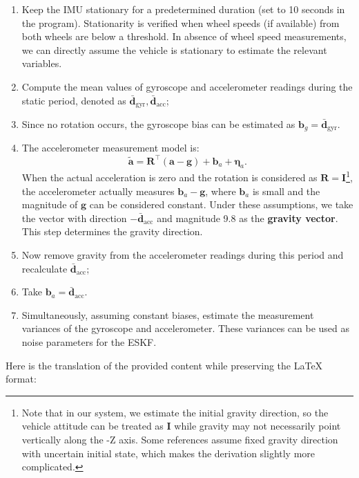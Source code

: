 \begin{enumerate}
\item Keep the IMU stationary for a predetermined duration (set to 10 seconds in the program). Stationarity is verified when wheel speeds (if available) from both wheels are below a threshold. In absence of wheel speed measurements, we can directly assume the vehicle is stationary to estimate the relevant variables.

\item Compute the mean values of gyroscope and accelerometer readings during the static period, denoted as $\bar{\bm{d}}_{\mathrm{gyr}}, \bar{\bm{d}}_{\mathrm{acc}}$;

\item Since no rotation occurs, the gyroscope bias can be estimated as $\bm{b}_{g} = \bar{\bm{d}}_{\mathrm{gyr}}$.

\item The accelerometer measurement model is:
\begin{equation}\label{key}
\tilde{\bm{a}} = \bm{R}^\top (\bm{a} - \bm{g}) + \bm{b}_a + \boldsymbol{\eta}_a.
\end{equation}
When the actual acceleration is zero and the rotation is considered as $\bm{R}=\bm{I}$\footnote{Note that in our system, we estimate the initial gravity direction, so the vehicle attitude can be treated as $\bm{I}$ while gravity may not necessarily point vertically along the -Z axis. Some references assume fixed gravity direction with uncertain initial state, which makes the derivation slightly more complicated.}, the accelerometer actually measures $\bm{b}_a - \bm{g}$, where $\bm{b}_a$ is small and the magnitude of $\bm{g}$ can be considered constant. Under these assumptions, we take the vector with direction $-\bar{\bm{d}}_{\mathrm{acc}}$ and magnitude 9.8 as the \textbf{gravity vector}. This step determines the gravity direction.

\item Now remove gravity from the accelerometer readings during this period and recalculate $\bar{\bm{d}}_{\mathrm{acc}}$;

\item Take $\bm{b}_a = \bar{\bm{d}}_{\mathrm{acc}}$.

\item Simultaneously, assuming constant biases, estimate the measurement variances of the gyroscope and accelerometer. These variances can be used as noise parameters for the ESKF.
\end{enumerate}
Here is the translation of the provided content while preserving the LaTeX format:

